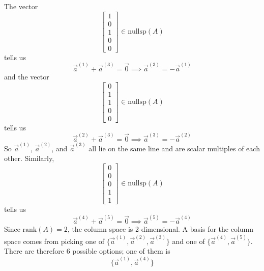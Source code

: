 \documentclass[11pt]{article}
\begin{document}
\begin{prob}
\begin{subprob}

\begin{solution}
The vector
\[
\begin{bmatrix}1\\0\\1\\0\\0\end{bmatrix}
\in \text{nullsp}(A)
\]
tells us
\[
\vec a^{(1)}+\vec a^{(3)}=\vec 0 \implies \vec a^{(3)} = -\vec a^{(1)}
\]
and the vector
\[
\begin{bmatrix}0\\1\\1\\0\\0\end{bmatrix}
\in \text{nullsp}(A)
\]
tells us
\[
\vec a^{(2)}+\vec a^{(3)}=\vec 0 \implies \vec a^{(3)} = -\vec a^{(2)}
\]
So $\vec a^{(1)}$, $\vec a^{(2)}$, and $\vec a^{(3)}$ all lie on the same line and are scalar multiples of each other. Similarly,
\[
\begin{bmatrix}0\\0\\0\\1\\1\end{bmatrix}
\in \text{nullsp}(A)
\]
tells us
\[
\vec a^{(4)}+\vec a^{(5)}=\vec 0 \implies \vec a^{(5)} = -\vec a^{(4)}
\]
Since $\text{rank}(A)=2$, the column space is 2-dimensional. A basis for the column space comes from picking one of $\{ \vec a^{(1)}, \vec a^{(2)}, \vec a^{(3)} \}$ and one of $\{ \vec a^{(4)}, \vec a^{(5)} \}$. There are therefore 6 possible options; one of them is
$$\boxed{\{\vec a^{(1)}, \vec a^{(4)}\}}$$
\end{solution}
\end{subprob}

\end{prob}

\newpage


\end{document}
